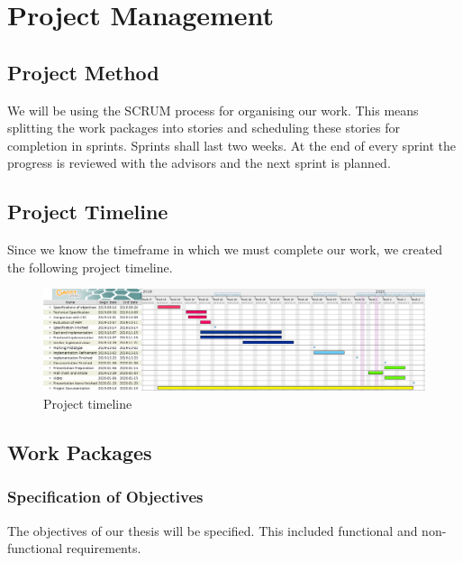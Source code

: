 \chapter{Project Management}
\label{ch:projectmanagement}

\section{Project Method}
\label{sec:projectmethod}
We will be using the SCRUM process for organising our work.
This means splitting the work packages into stories and scheduling these stories for completion in sprints.
Sprints shall last two weeks.
At the end of every sprint the progress is reviewed with the advisors and the next sprint is planned.

\section{Project Timeline}
\label{sec:projecttimeline}
Since we know the timeframe in which we must complete our work, we created the following project timeline.

\begin{landscape}
\vspace*{\fill}
	\begin{figure}[H]
	\begin{center}
		\includegraphics[scale=0.5]{images/Projectplan.png}
		\caption{Project timeline}
		\label{fig:projecttimeline}
	\end{center}
	\end{figure}
\vspace*{\fill}
\end{landscape}

\section{Work Packages}
\label{sec:workpackages}

\subsection{Specification of Objectives}\label{subsec:specification-of-objectives}
The objectives of our thesis will be specified.
This included functional and non-functional requirements.

